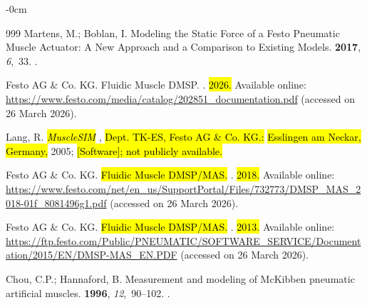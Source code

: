 \documentclass[actuators,article,accept,pdftex,moreauthors]{Definitions/mdpi}
\begin{document}
\begin{adjustwidth}{-\extralength}{0cm}
\begin{thebibliography}{999}
Martens, M.; Boblan, I.
\newblock Modeling the {Static} {Force} of a {Festo} {Pneumatic} {Muscle}
  {Actuator}: {A} {New} {Approach} and a {Comparison} to {Existing} {Models}.
 {\bf 2017}, {\em 6},~33.
.

{Festo AG \& Co. KG}.
\newblock Fluidic Muscle DMSP.
.\hl{ 2026.} %
 Available online:
  \url{https://www.festo.com/media/catalog/202851_documentation.pdf} (accessed
  on 26 March 2026).

Lang, R.
\newblock \emph{\hl{MuscleSIM}%
}, \hl{Dept. TK-ES, Festo AG \& Co. KG.:} %
  \hl{Esslingen am Neckar, Germany,} %
  2005;
\newblock \hl{[Software]; not publicly available.} %


{Festo AG \& Co. KG}.
\newblock \hl{Fluidic Muscle DMSP/MAS. } %
. \hl{2018.} %
 Available online:
  \url{https://www.festo.com/net/en_us/SupportPortal/Files/732773/DMSP_MAS_2018-01f_8081496g1.pdf}
  (accessed on 26 March 2026).

{Festo AG \& Co. KG}.
\newblock \hl{Fluidic Muscle DMSP/MAS.}
. \hl{2013.} %
 Available online:
  \url{https://ftp.festo.com/Public/PNEUMATIC/SOFTWARE_SERVICE/Documentation/2015/EN/DMSP-MAS_EN.PDF}
  (accessed on 26 March 2026).

Chou, C.P.; Hannaford, B.
\newblock Measurement and modeling of {McKibben} pneumatic artificial muscles.
 {\bf 1996}, {\em
  12},~90--102.
.


\end{thebibliography}
\end{adjustwidth}
\end{document}

